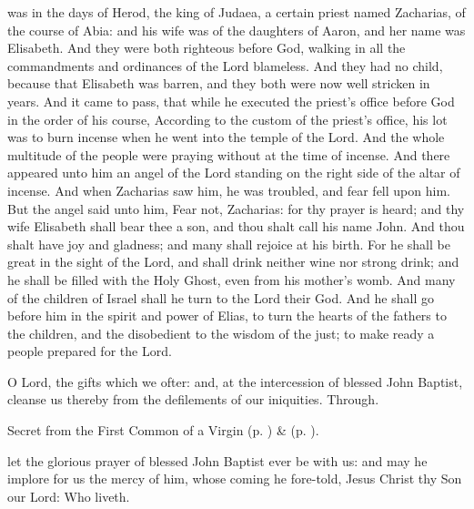  was in the days of Herod, the king of Judaea, a certain priest named Zacharias, of the course of Abia: and his wife was of the daughters of Aaron, and her name was Elisabeth. And they were both righteous before God, walking in all the commandments and ordinances of the Lord blameless. And they had no child, because that Elisabeth was barren, and they both were now well stricken in years. And it came to pass, that while he executed the priest's office before God in the order of his course, According to the custom of the priest's office, his lot was to burn incense when he went into the temple of the Lord. And the whole multitude of the people were praying without at the time of incense. And there appeared unto him an angel of the Lord standing on the right side of the altar of incense. And when Zacharias saw him, he was troubled, and fear fell upon him. But the angel said unto him, Fear not, Zacharias: for thy prayer is heard; and thy wife Elisabeth shall bear thee a son, and thou shalt call his name John. And thou shalt have joy and gladness; and many shall rejoice at his birth. For he shall be great in the sight of the Lord, and shall drink neither wine nor strong drink; and he shall be filled with the Holy Ghost, even from his mother's womb. And many of the children of Israel shall he turn to the Lord their God. And he shall go before him in the spirit and power of Elias, to turn the hearts of the fathers to the children, and the disobedient to the wisdom of the just; to make ready a people prepared for the Lord.

\clearpage
{}

\secret\label{JohnBaptistVigilSecret}
 O Lord, the gifts which we ofter: and, at the intercession of blessed John Baptist, cleanse us thereby from the defilements of our iniquities. Through.

\begin{rubric}
 Secret  from the First Common of a Virgin (p. \pageref{CommonVirginOnlyISecret}) \&   (p. \pageref{SPSaints}).
\end{rubric}


\postcommunion\label{JohnBaptistVigilPostcommunion}
 let the glorious prayer of blessed John Baptist ever be with us: and may he implore for us the mercy of him, whose coming he fore-told, Jesus Christ thy Son our Lord: Who liveth.

